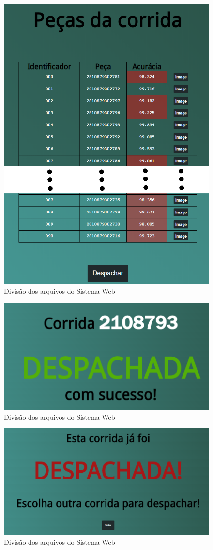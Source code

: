 \begin{figure}[htbp]
	\centering
	\includegraphics[width=0.65\linewidth]{figuras/WebService/Screens/detail 2.1.png}
	\caption{Divisão dos arquivos do Sistema Web}
	\label{fig:cleanArchtecture}
\end{figure}


\begin{figure}[htbp]
	\centering
	\includegraphics[width=0.5\linewidth]{figuras/WebService/Screens/corrida_desp.png}
	\caption{Divisão dos arquivos do Sistema Web}
	\label{fig:cleanArchtecture}
\end{figure}

\begin{figure}[htbp]
	\centering
	\includegraphics[width=0.5\linewidth]{figuras/WebService/Screens/corrida_desp_X.png}
	\caption{Divisão dos arquivos do Sistema Web}
	\label{fig:cleanArchtecture}
\end{figure}

